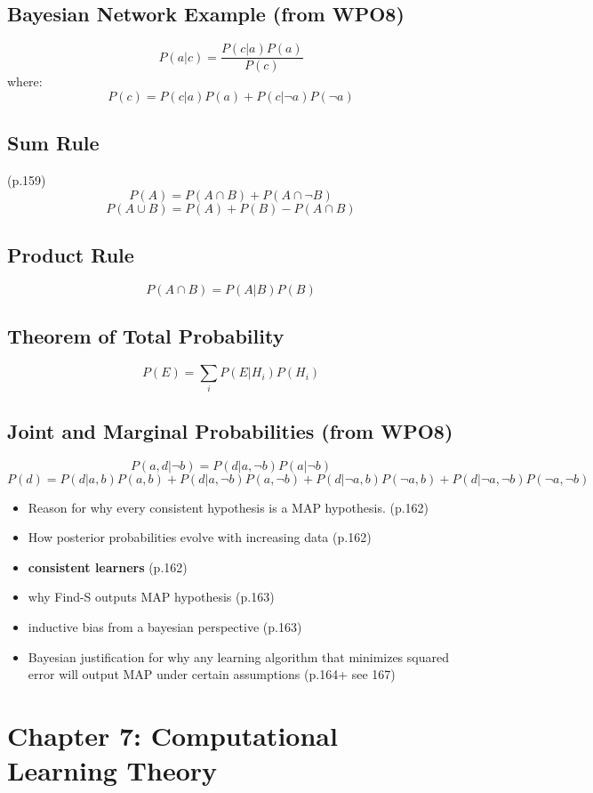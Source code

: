 \documentclass[10pt,a4paper]{article}
\begin{document}
\subsection*{Bayesian Network Example (from WPO8)}
\[
P(a|c) = \frac{P(c|a)P(a)}{P(c)}
\]
where:
\[
P(c) = P(c|a)P(a) + P(c|\neg a)P(\neg a)
\]

\subsection*{Sum Rule} (p.159)
\[
P(A) = P(A \cap B) + P(A \cap \neg B)
\]
\[
P(A \cup B) = P(A) + P(B) - P(A \cap B)
\]
\subsection*{Product Rule}
\[
P(A \cap B) = P(A|B)P(B)
\]

\subsection*{Theorem of Total Probability}
\[
P(E) = \sum_{i} P(E|H_i)P(H_i)
\]


\subsection*{Joint and Marginal Probabilities (from WPO8)}
\[
P(a, d|\neg b) = P(d|a, \neg b)P(a|\neg b)
\]
\[
P(d) = P(d|a, b)P(a, b) + P(d|a, \neg b)P(a, \neg b) + P(d|\neg a, b)P(\neg a, b) + P(d|\neg a, \neg b)P(\neg a, \neg b)
\]
\newline
\begin{itemize}
	\item Reason for why every consistent hypothesis is a MAP hypothesis. (p.162)
	\item How posterior probabilities evolve with increasing data (p.162)
	\item \textbf{consistent learners} (p.162)
	\item why Find-S outputs MAP hypothesis (p.163)
	\item inductive bias from a bayesian perspective (p.163)
	\item Bayesian justification for why any learning algorithm that minimizes squared error will output MAP under certain assumptions (p.164+ see 167)
	
	
	
\end{itemize}
\section*{Chapter 7: Computational Learning Theory}
\end{document}
